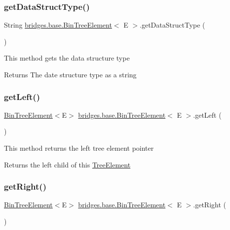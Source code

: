 \subsubsection{\texorpdfstring{get\+Data\+Struct\+Type()}{getDataStructType()}}
{\footnotesize\ttfamily String \hyperlink{classbridges_1_1base_1_1_bin_tree_element}{bridges.\+base.\+Bin\+Tree\+Element}$<$ E $>$.get\+Data\+Struct\+Type (\begin{DoxyParamCaption}{ }\end{DoxyParamCaption})}

This method gets the data structure type

\begin{DoxyReturn}{Returns}
The date structure type as a string 
\end{DoxyReturn}
\hypertarget{classbridges_1_1base_1_1_bin_tree_element_aeb6fd894af8e158c9c48dd0749d1bd22}{}\label{classbridges_1_1base_1_1_bin_tree_element_aeb6fd894af8e158c9c48dd0749d1bd22} 
\subsubsection{\texorpdfstring{get\+Left()}{getLeft()}}
{\footnotesize\ttfamily \hyperlink{classbridges_1_1base_1_1_bin_tree_element}{Bin\+Tree\+Element}$<$E$>$ \hyperlink{classbridges_1_1base_1_1_bin_tree_element}{bridges.\+base.\+Bin\+Tree\+Element}$<$ E $>$.get\+Left (\begin{DoxyParamCaption}{ }\end{DoxyParamCaption})}

This method returns the left tree element pointer \begin{DoxyReturn}{Returns}
the left child of this \hyperlink{classbridges_1_1base_1_1_tree_element}{Tree\+Element} 
\end{DoxyReturn}
\hypertarget{classbridges_1_1base_1_1_bin_tree_element_aa3855c26617ada7248a9d4f83cf455b7}{}\label{classbridges_1_1base_1_1_bin_tree_element_aa3855c26617ada7248a9d4f83cf455b7} 
\subsubsection{\texorpdfstring{get\+Right()}{getRight()}}
{\footnotesize\ttfamily \hyperlink{classbridges_1_1base_1_1_bin_tree_element}{Bin\+Tree\+Element}$<$E$>$ \hyperlink{classbridges_1_1base_1_1_bin_tree_element}{bridges.\+base.\+Bin\+Tree\+Element}$<$ E $>$.get\+Right (\begin{DoxyParamCaption}{ }\end{DoxyParamCaption})}

